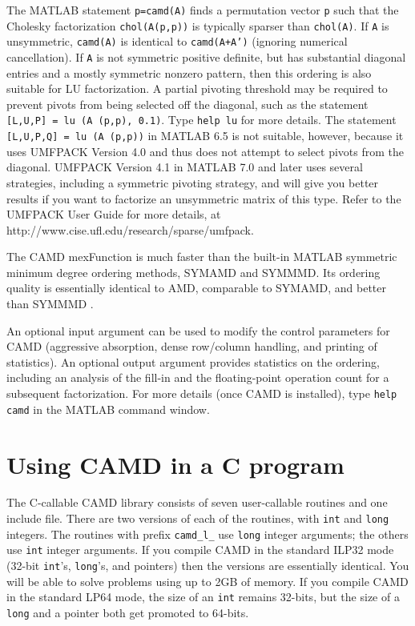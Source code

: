 \documentclass[11pt]{article}
\begin{document}
The MATLAB statement {\tt p=camd(A)} finds a permutation vector {\tt p} such
that the Cholesky factorization {\tt chol(A(p,p))} is typically sparser than
{\tt chol(A)}.
If {\tt A} is unsymmetric, {\tt camd(A)} is identical to {\tt camd(A+A')}
(ignoring numerical cancellation).
If {\tt A} is not symmetric positive definite,
but has substantial diagonal entries and a mostly symmetric nonzero pattern,
then this ordering is also suitable for LU factorization.  A partial pivoting
threshold may be required to prevent pivots from being selected off the
diagonal, such as the statement {\tt [L,U,P] = lu (A (p,p), 0.1)}.
Type {\tt help lu} for more details.
The statement {\tt [L,U,P,Q] = lu (A (p,p))} in MATLAB 6.5 is
not suitable, however, because it uses UMFPACK Version 4.0 and thus
does not attempt to select pivots from the diagonal.
UMFPACK Version 4.1 in MATLAB 7.0 and later
uses several strategies, including a symmetric pivoting strategy, and
will give you better results if you want to factorize an unsymmetric matrix
of this type.  Refer to the UMFPACK User Guide for more details, at
http://www.cise.ufl.edu/research/sparse/umfpack.

The CAMD mexFunction is much faster than the built-in MATLAB symmetric minimum
degree ordering methods, SYMAMD and SYMMMD.  Its ordering quality is
essentially identical to AMD, comparable to SYMAMD, and better than SYMMMD
\cite{DavisGilbertLarimoreNg04}.

An optional input argument can be used to modify the control parameters for
CAMD (aggressive absorption, dense row/column handling, and printing of
statistics).  An optional output
argument provides statistics on the ordering, including an analysis of the
fill-in and the floating-point operation count for a subsequent factorization.
For more details (once CAMD is installed),
type {\tt help camd} in the MATLAB command window.

\section{Using CAMD in a C program}
\label{Cversion}

The C-callable CAMD library consists of seven user-callable routines and one
include file.  There are two versions of each of the routines, with
{\tt int} and {\tt long} integers.
The routines with prefix
{\tt camd\_l\_} use {\tt long} integer arguments; the others use
{\tt int} integer arguments.  If you compile CAMD in the standard
ILP32 mode (32-bit {\tt int}'s, {\tt long}'s, and pointers) then the versions
are essentially identical.  You will be able to solve problems using up to 2GB
of memory.  If you compile CAMD in the standard LP64 mode, the size of an
{\tt int} remains 32-bits, but the size of a {\tt long} and a pointer both get
promoted to 64-bits.
\end{document}
